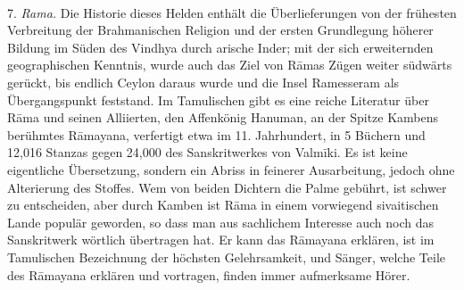 \documentclass{article}
\begin{document}
\paragraph{}
7. \emph{Rama.} Die Historie dieses Helden enthält die Überlieferungen von der frühesten Verbreitung der Brahmanischen Religion und der ersten Grundlegung höherer Bildung im Süden des Vindhya durch arische Inder; mit der sich erweiternden geographischen Kenntnis, wurde auch das Ziel von R\={a}mas Zügen weiter südwärts gerückt, bis endlich Ceylon daraus wurde und die Insel Ramesseram als Übergangspunkt feststand. Im Tamulischen gibt es eine reiche Literatur über R\={a}ma und seinen Alliierten, den Affenkönig Hanuman, an der Spitze Kambens berühmtes R\={a}mayana, verfertigt etwa im 11. Jahrhundert, in 5 Büchern und 12,016 Stanzas gegen 24,000 des Sanskritwerkes von Valm\={i}ki. Es ist keine eigentliche Übersetzung, sondern ein Abriss in feinerer Ausarbeitung, jedoch ohne Alterierung des Stoffes. Wem von beiden Dichtern die Palme gebührt, ist schwer zu entscheiden, aber durch Kamben ist R\={a}ma in einem vorwiegend sivaitischen Lande populär geworden, so dass man aus sachlichem Interesse auch noch das Sanskritwerk wörtlich übertragen hat. Er kann das R\={a}mayana erklären, ist im Tamulischen Bezeichnung der höchsten Gelehrsamkeit, und Sänger, welche Teile des R\={a}mayana erklären und vortragen, finden immer aufmerksame Hörer.
\end{document}
